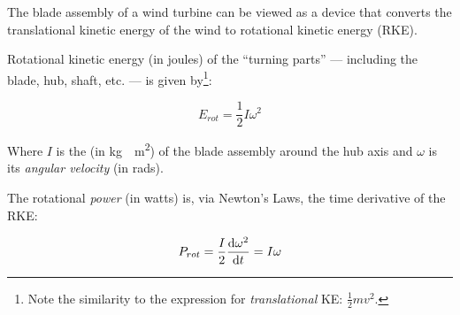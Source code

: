 \documentclass[11pt]{article}
\begin{document}
The blade assembly of a wind turbine can be viewed as a device that
converts the translational kinetic energy of the wind to rotational
kinetic energy (RKE).

Rotational kinetic energy (in joules) of the ``turning parts'' ---
including the blade, hub, shaft, etc. --- is given by\footnote{Note
  the similarity to the expression for \emph{translational} KE:
  $\frac{1}{2}mv^2$.}:

\begin{equation}
\label{eqn:rke}
E_{rot} = \frac{1}{2}I\omega^2
\end{equation}

Where $I$ is the  (in \unit{kg\cdot m^2}) of
the blade assembly around the hub axis and $\omega$ is its
\emph{angular velocity} (in \unit{rad}{s}). 

The rotational \emph{power} (in watts) is, via Newton's Laws, the time
derivative of the RKE:

\begin{equation}
\label{eqn:rpow}
P_{rot} = \frac{I}{2}\deedee{\omega^2}{t} = I\omega
\end{equation}


\clearpage
\appendix


\end{document}
